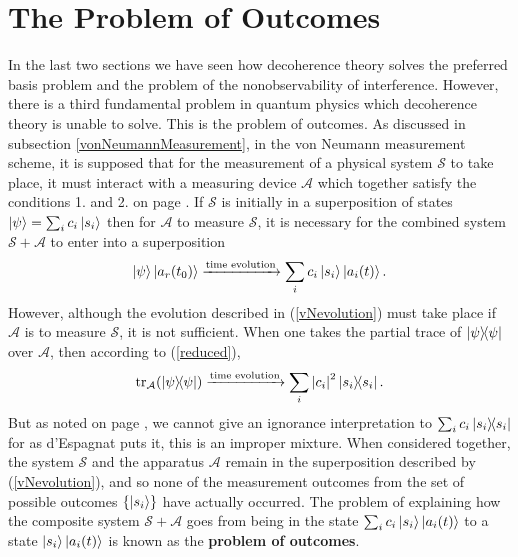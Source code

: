 \documentclass[letter, 12pt]{turabian-thesis}
\theoremstyle{hypothesis}
\begin{document}
\section{The Problem of Outcomes}\label{probOutcomes}
In the last two sections we have seen how decoherence theory solves the preferred basis problem and the problem of the nonobservability of interference. However, there is a third fundamental problem in quantum physics which decoherence theory is unable to solve. This is the problem of outcomes. As discussed in subsection \ref{vonNeumannMeasurement}, in the von Neumann measurement scheme, it is supposed that for the measurement of a physical system $\mathcal{S}$ to take place, it must interact with a measuring device $\mathcal{A}$ which together satisfy the conditions 1. and 2. on page \pageref{vonNeumannMeasurement1}. If $\mathcal{S}$ is initially in a superposition of states $\ket{\psi}=\sum_i c_i\ket{s_i}$ then for $\mathcal{A}$ to measure $\mathcal{S}$, it is necessary for the combined system $\mathcal{S}+\mathcal{A}$ to enter into a superposition
\begin{equation}\label{vNevolution}
\ket{\psi}\ket{a_r(t_0)}\xrightarrow{\text{time evolution}}\sum_i c_i\ket{s_i}\ket{a_i(t)}.
\end{equation}
However, although the evolution described in (\ref{vNevolution}) must take place if $\mathcal{A}$ is to measure $\mathcal{S}$, it is not sufficient. When one takes the partial trace of $\dyad{\psi}$ over $\mathcal{A}$, then according to (\ref{reduced}),
\begin{equation}\label{vNevolution2}
\tr_\mathcal{A}(\dyad{\psi})\xrightarrow{\text{time evolution}}\sum_i \abs{c_i}^2\dyad{s_i}.
\end{equation}
But as noted on page \pageref{Espagnat}, we cannot give an ignorance interpretation to $\sum_i c_i\dyad{s_i}$ for as d'Espagnat puts it, this is an improper mixture. When considered together, the system $\mathcal{S}$ and the apparatus $\mathcal{A}$ remain in the superposition described by (\ref{vNevolution}), and so none of the measurement outcomes from the set of possible outcomes $\{\ket{s_i}\}$ have actually occurred. The problem of explaining how the composite system   $\mathcal{S}+\mathcal{A}$       goes from being in the state $\sum_i c_i\ket{s_i}\ket{a_i(t)}$ to a state $\ket{s_i}\ket{a_i(t)}$ is known as the \textbf{problem of outcomes}. 
\end{document}
